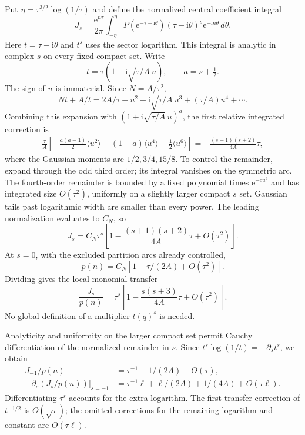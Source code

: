 \documentclass[11pt,letterpaper]{article}
\numberwithin{equation}{section}
\theoremstyle{definition}\newtheorem{definition}[theorem]{Definition}
\theoremstyle{remark}\newtheorem{remark}[theorem]{Remark}
\newcommand{\ii}{\mathrm i}
\newcommand{\ee}{\mathrm e}
\begin{document}
Put $\eta=\tau^{3/2}\log(1/\tau)$ and define the normalized central coefficient integral
\begin{equation}\label{dmv:sum:eq:Jsdef}
 J_s=\frac{\ee^{n\tau}}{2\pi}\int_{-\eta}^{\eta}
 P(\ee^{-\tau+\ii\theta})(\tau-\ii\theta)^s\ee^{-\ii n\theta}\,d\theta.
\end{equation}
Here $t=\tau-\ii\theta$ and $t^s$ uses the sector logarithm. This integral is analytic in complex $s$ on every fixed compact set. Write
\[
 t=\tau(1+\ii\sqrt{\tau/A}\,u),\qquad a=s+\tfrac12.
\]
The sign of $u$ is immaterial. Since $N=A/\tau^2$,
\[
 Nt+A/t=2A/\tau-u^2+\ii\sqrt{\tau/A}\,u^3+(\tau/A)u^4+\cdots.
\]
Combining this expansion with $(1+\ii\sqrt{\tau/A}\,u)^a$, the first relative integrated correction is
\begin{align}\label{dmv:sum:eq:gaussian}
 \frac\tau A\left[-\frac{a(a-1)}2\langle u^2\rangle
 +(1-a)\langle u^4\rangle-\frac12\langle u^6\rangle\right]
 =-\frac{(s+1)(s+2)}{4A}\tau,
\end{align}
where the Gaussian moments are $1/2,3/4,15/8$. To control the remainder, expand through the odd third order; its integral vanishes on the symmetric arc. The fourth-order remainder is bounded by a fixed polynomial times $\ee^{-c u^2}$ and has integrated size $O(\tau^2)$, uniformly on a slightly larger compact $s$ set. Gaussian tails past logarithmic width are smaller than every power. The leading normalization evaluates to $C_N$, so
\begin{equation}\label{dmv:sum:eq:Jsabs}
 J_s=C_N\tau^s\left[1-\frac{(s+1)(s+2)}{4A}\tau+O(\tau^2)\right].
\end{equation}
At $s=0$, with the excluded partition arcs already controlled,
\begin{equation}\label{dmv:sum:eq:partition}
 p(n)=C_N[1-\tau/(2A)+O(\tau^2)].
\end{equation}
Dividing gives the local monomial transfer
\begin{equation}\label{dmv:sum:eq:Jsmean}
 \frac{J_s}{p(n)}=\tau^s\left[1-\frac{s(s+3)}{4A}\tau+O(\tau^2)\right].
\end{equation}
No global definition of a multiplier $t(q)^s$ is needed.

Analyticity and uniformity on the larger compact set permit Cauchy differentiation of the normalized remainder in $s$. Since $t^s\log(1/t)=-\partial_st^s$, we obtain
\begin{align}\label{dmv:sum:eq:logtransfer}
 J_{-1}/p(n)&=\tau^{-1}+1/(2A)+O(\tau),\nonumber\\
 -\left.\partial_s(J_s/p(n))\right|_{s=-1}
 &=\tau^{-1}\ell+\ell/(2A)+1/(4A)+O(\tau\ell).
\end{align}
Differentiating $\tau^s$ accounts for the extra logarithm. The first transfer correction of $t^{-1/2}$ is $O(\sqrt\tau)$; the omitted corrections for the remaining logarithm and constant are $O(\tau\ell)$.
\end{document}

